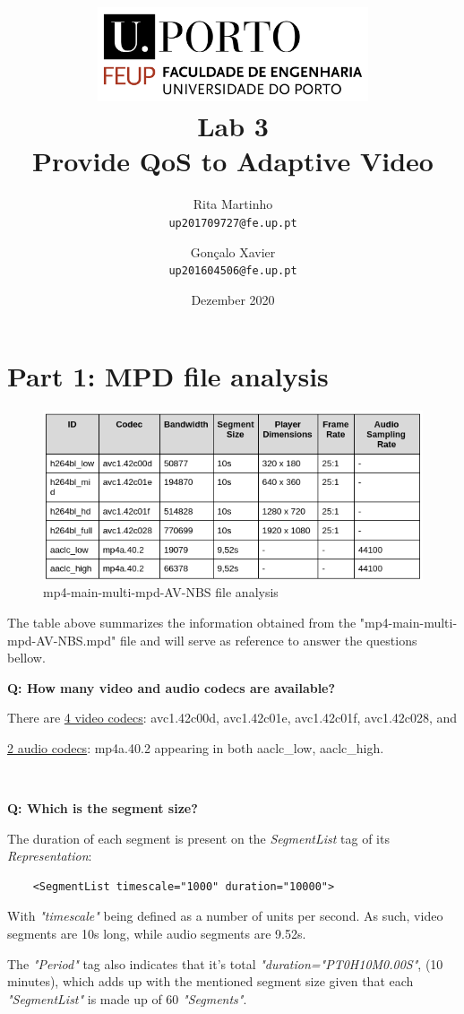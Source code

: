 \documentclass{article}
\title{
\includegraphics[width=0.6\textwidth]{feup.png}\\
Lab 3\\
Provide QoS to Adaptive Video\\
}
\author{
  Rita Martinho\\
  \texttt{up201709727@fe.up.pt}
  \and
  Gonçalo Xavier\\
  \texttt{up201604506@fe.up.pt}
}
\date{Dezember 2020}
\newcommand{\Question}[1]{\textbf{Q: #1}}
\begin{document}
\maketitle

\section*{Part 1: MPD file analysis} 
\begin{figure}[h!]
    \centering
    \includegraphics[width=0.9\linewidth,keepaspectratio]{MPDTable}
    \caption{mp4-main-multi-mpd-AV-NBS file analysis}
    \label{fig:MPD_Analysis}
\end{figure}
\FloatBarrier

The table above summarizes the information obtained from the 
"mp4-main-multi-mpd-AV-NBS.mpd" file and will serve as reference 
to answer the questions bellow.
\newline  

\Question{How many video and audio codecs are available?}

There are \underline{4 video codecs}: avc1.42c00d, avc1.42c01e, avc1.42c01f, avc1.42c028, and 

\underline{2 audio codecs}: mp4a.40.2 appearing in both aaclc\_low, aaclc\_high.

~\newline  

\Question{Which is the segment size?}

The duration of each segment is present on the \textit{SegmentList} tag of its 
\textit{Representation}: 
\begin{verbatim}
    <SegmentList timescale="1000" duration="10000">
\end{verbatim}

With \textit{"timescale"} being defined as a number of units per second.
As such, video segments are 10s long, while audio segments are 9.52s.

The \textit{"Period"} tag also indicates that it's total 
\textit{"duration="PT0H10M0.00S"}, (10 minutes), which adds up with the 
mentioned segment size given that each \textit{"SegmentList"} is made up of 60
\textit{"Segments"}.
\end{document}
